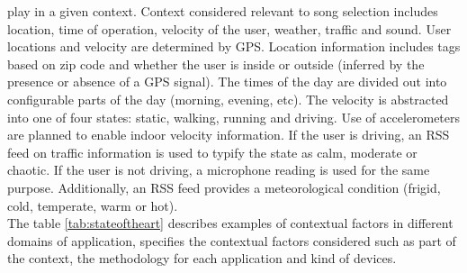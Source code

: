 play in a given context. Context considered relevant to song selection
includes location, time of operation, velocity of the user, weather,
traffic and sound. User locations and velocity are determined by GPS.
Location information includes tags based on zip code and whether the
user is inside or outside (inferred by the presence or absence of a
GPS signal). The times of the day are divided out into configurable
parts of the day (morning, evening, etc). The velocity is abstracted
into one of four states: static, walking, running and driving. Use of
accelerometers are planned to enable indoor velocity information. If
the user is driving, an RSS feed on traffic information is used to
typify the state as calm, moderate or chaotic. If the user is not
driving, a microphone reading is used for the same purpose.
Additionally, an RSS feed provides a meteorological condition (frigid,
cold, temperate, warm or hot).\\ The table \ref{tab:stateoftheart}  
describes examples of contextual factors in different domains 
of application, specifies the contextual factors considered 
such as  part of the context, the methodology for each 
application and  kind of devices.

